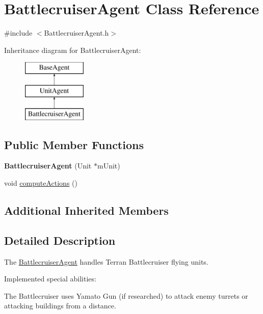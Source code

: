 \hypertarget{class_battlecruiser_agent}{\section{Battlecruiser\-Agent Class Reference}
\label{class_battlecruiser_agent}
}


{\ttfamily \#include $<$Battlecruiser\-Agent.\-h$>$}

Inheritance diagram for Battlecruiser\-Agent\-:\begin{figure}[H]
\begin{center}
\leavevmode
\includegraphics[height=3.000000cm]{class_battlecruiser_agent}
\end{center}
\end{figure}
\subsection*{Public Member Functions}
\begin{DoxyCompactItemize}
\item 
\hypertarget{class_battlecruiser_agent_ac714487d201ed7ab8a7a86edc7d8d871}{{\bfseries Battlecruiser\-Agent} (Unit $\ast$m\-Unit)}\label{class_battlecruiser_agent_ac714487d201ed7ab8a7a86edc7d8d871}

\item 
void \hyperlink{class_battlecruiser_agent_a8e27cc343b663e6cc23f0f4cd3ace56b}{compute\-Actions} ()
\end{DoxyCompactItemize}
\subsection*{Additional Inherited Members}


\subsection{Detailed Description}
The \hyperlink{class_battlecruiser_agent}{Battlecruiser\-Agent} handles Terran Battlecruiser flying units.

Implemented special abilities\-:
\begin{DoxyItemize}
\item The Battlecruiser uses Yamato Gun (if researched) to attack enemy turrets or attacking buildings from a distance.
\end{DoxyItemize}

